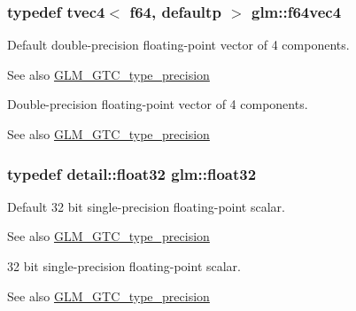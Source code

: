 \subsubsection[{f64vec4}]{\setlength{\rightskip}{0pt plus 5cm}typedef tvec4$<$ f64, defaultp $>$ {\bf glm\+::f64vec4}}\label{group__gtc__type__precision_ga9d896f484039b22873e7bfb9e06f7b47}
Default double-\/precision floating-\/point vector of 4 components. \begin{DoxySeeAlso}{See also}
\hyperlink{group__gtc__type__precision}{G\+L\+M\+\_\+\+G\+T\+C\+\_\+type\+\_\+precision}
\end{DoxySeeAlso}
Double-\/precision floating-\/point vector of 4 components. \begin{DoxySeeAlso}{See also}
\hyperlink{group__gtc__type__precision}{G\+L\+M\+\_\+\+G\+T\+C\+\_\+type\+\_\+precision} 
\end{DoxySeeAlso}
\hypertarget{group__gtc__type__precision_ga814f2f65354b6588b067cc5c67a6b340}{}
\subsubsection[{float32}]{\setlength{\rightskip}{0pt plus 5cm}typedef detail\+::float32 {\bf glm\+::float32}}\label{group__gtc__type__precision_ga814f2f65354b6588b067cc5c67a6b340}
Default 32 bit single-\/precision floating-\/point scalar. \begin{DoxySeeAlso}{See also}
\hyperlink{group__gtc__type__precision}{G\+L\+M\+\_\+\+G\+T\+C\+\_\+type\+\_\+precision}
\end{DoxySeeAlso}
32 bit single-\/precision floating-\/point scalar. \begin{DoxySeeAlso}{See also}
\hyperlink{group__gtc__type__precision}{G\+L\+M\+\_\+\+G\+T\+C\+\_\+type\+\_\+precision} 
\end{DoxySeeAlso}
\hypertarget{group__gtc__type__precision_ga642737ae3e7c434b366f2191e6944bf2}{}
